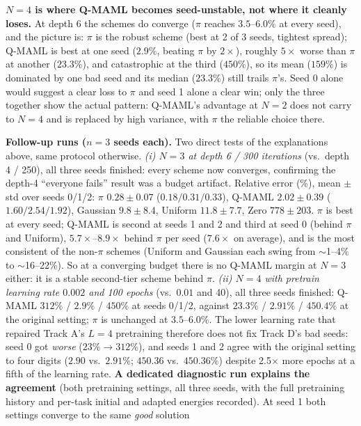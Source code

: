 \documentclass[11pt]{article}
\begin{document}
\begin{keyresult}
\textbf{$N{=}4$ is where Q-MAML becomes seed-unstable, not where it cleanly loses.} At depth 6 the
schemes do converge ($\pi$ reaches $3.5$--$6.0\%$ at every seed), and the picture is: $\pi$ is the robust
scheme (best at 2 of 3 seeds, tightest spread); Q-MAML is best at one seed ($2.9\%$, beating $\pi$ by
$2\times$), roughly $5\times$ worse than $\pi$ at another ($23.3\%$), and catastrophic at the third
($450\%$), so its mean ($159\%$) is dominated by one bad seed and its median ($23.3\%$) still trails $\pi$'s.
Seed 0 alone would suggest a clear loss to $\pi$ and seed 1 alone a clear win; only the three together show
the actual pattern: Q-MAML's advantage at $N{=}2$ does not carry to $N{=}4$ and is replaced by high variance,
with $\pi$ the reliable choice there.

\textbf{Follow-up runs ($n{=}3$ seeds each).} Two direct tests of the
explanations above, same protocol otherwise.
\emph{(i) $N{=}3$ at depth 6 / 300 iterations} (vs.\ depth 4 / 250), all three seeds finished: every scheme
now converges, confirming the depth-4 ``everyone fails'' result was a budget artifact. Relative error (\%),
mean $\pm$ std over seeds 0/1/2: $\pi$ $\mathbf{0.28}\pm0.07$ ($0.18/0.31/0.33$), Q-MAML $2.02\pm0.39$
($1.60/2.54/1.92$), Gaussian $9.8\pm8.4$, Uniform $11.8\pm7.7$, Zero $778\pm203$. $\pi$ is best at every
seed; Q-MAML is second at seeds 1 and 2 and third at seed 0 (behind $\pi$ and Uniform), $5.7\times$--$8.9\times$
behind $\pi$ per seed ($7.6\times$ on average), and is the most consistent of the non-$\pi$ schemes (Uniform
and Gaussian each swing from $\sim$1--4\% to $\sim$16--22\%). So at a converging budget there is no Q-MAML
margin at $N{=}3$ either: it is a stable second-tier scheme behind $\pi$.
\emph{(ii) $N{=}4$ with pretrain learning rate $0.002$ and 100 epochs} (vs.\ $0.01$ and 40), all three
seeds finished: Q-MAML $312\%$ / $2.9\%$ / $450\%$ at seeds 0/1/2, against $23.3\%$ / $2.91\%$ / $450.4\%$ at
the original setting; $\pi$ is unchanged at $3.5$--$6.0\%$. The lower learning rate that repaired Track A's
$L{=}4$ pretraining therefore does not fix Track D's bad seeds: seed 0 got \emph{worse} ($23\%\to312\%$), and
seeds 1 and 2 agree with the original setting to four digits ($2.90$ vs.\ $2.91\%$; $450.36$ vs.\ $450.36\%$)
despite 2.5$\times$ more epochs at a fifth of the learning rate. \textbf{A dedicated diagnostic run explains
the agreement} (both pretraining settings, all three seeds, with the full pretraining history and per-task
initial and adapted energies recorded). At seed 1 both settings converge to the same \emph{good} solution

\end{keyresult}
\end{document}
